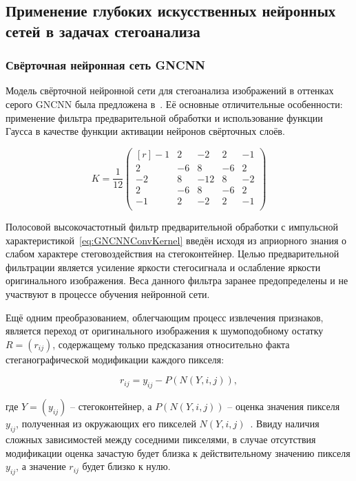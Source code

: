 \subsection{Применение глубоких искусственных нейронных сетей в задачах стегоанализа}
\subsubsection{Свёрточная нейронная сеть GNCNN}

Модель свёрточной нейронной сети для стегоанализа изображений в оттенках серого GNCNN была предложена в~\cite{GNCNN}. Её основные отличительные особенности: применение фильтра предварительной обработки и использование функции Гаусса в качестве функции активации нейронов свёрточных слоёв.

\begin{equation}
\label{eq:GNCNNConvKernel}
K = \frac{1}{12}
\begin{pmatrix*}[r]
    -1 &  2 &    -2 &  2 & -1 \\
     2 & -6 &     8 & -6 &  2 \\
    -2 &  8 & -12 &  8 & -2 \\
     2 & -6 &     8 & -6 &  2 \\
    -1 &  2 &    -2 &  2 & -1 \\
\end{pmatrix*}
\end{equation}

Полосовой высокочастотный фильтр предварительной обработки с импульсной характеристикой~\eqref{eq:GNCNNConvKernel} введён исходя из априорного знания о слабом характере стеговоздействия на стегоконтейнер. Целью предварительной фильтрации является усиление яркости стегосигнала и ослабление яркости оригинального изображения. Веса данного фильтра заранее предопределены и не участвуют в процессе обучения нейронной сети.

Ещё одним преобразованием, облегчающим процесс извлечения признаков, является переход от оригинального изображения к шумоподобному остатку $ R = (r_{ij}) $, содержащему только предсказания относительно факта стеганографической модификации каждого пикселя:

\begin{equation*}
r_{ij} = y_{ij} - P(N(Y, i, j)),
\end{equation*}

где $ Y = (y_{ij}) $ – стегоконтейнер, а $ P(N(Y, i, j)) $ – оценка значения пикселя $ y_{ij} $, полученная из окружающих его пикселей $ N(Y, i, j) $~\cite{FridrichNoiseResidual}. Ввиду наличия сложных зависимостей между соседними пикселями, в случае отсутствия модификации оценка зачастую будет близка к действительному значению пикселя $ y_{ij} $, а значение $ r_{ij} $ будет близко к нулю.

